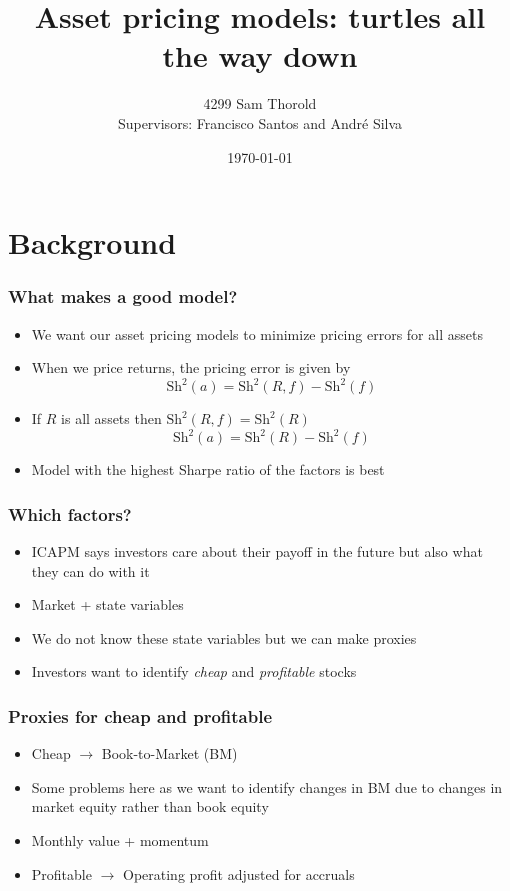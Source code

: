 \documentclass{beamer}
\title[Turtles]{Asset pricing models: turtles all the way down}
\author[Thorold]{4299 Sam Thorold\\
                 Supervisors: Francisco Santos and Andr\'e Silva}
\institute{NHH and NOVA}
\date[April 2018]{\today}
\begin{document}
\frame{\titlepage}


\section{Background}

\begin{frame}
\frametitle{What makes a good model?}
\begin{itemize}
    \item<1-> We want our asset pricing models to minimize pricing errors for
    all assets
    \item<1-> When we price returns, the pricing error is given by
    \[
    \text{Sh}^2(a) = \text{Sh}^2(R, f) - \text{Sh}^2(f)
    \]
    \item<2-> If $R$ is all assets then $\text{Sh}^2(R, f) = \text{Sh}^2(R)$
    \[
    \text{Sh}^2(a) = \text{Sh}^2(R) - \text{Sh}^2(f)
    \]
    \item<2->Model with the highest Sharpe ratio of the factors is best
\end{itemize}
\end{frame}

\begin{frame}
\frametitle{Which factors?}
\begin{itemize}
    \item<1-> ICAPM says investors care about their payoff in the future but
    also what they can do with it
    \item<1-> Market + state variables
    \item<1-> We do not know these state variables but we can make proxies
    \item<2-> Investors want to identify \emph{cheap} and \emph{profitable} stocks
\end{itemize}
\end{frame}

\begin{frame}
\frametitle{Proxies for cheap and profitable}
\begin{itemize}
    \item<1-> Cheap $\rightarrow$ Book-to-Market (BM)
    \item<1-> Some problems here as we want to identify changes in BM due to
    changes in market equity rather than book equity
    \item<1-> Monthly value + momentum
    \item<2-> Profitable $\rightarrow$ Operating profit adjusted for accruals
\end{itemize}
\end{frame}
\end{document}
